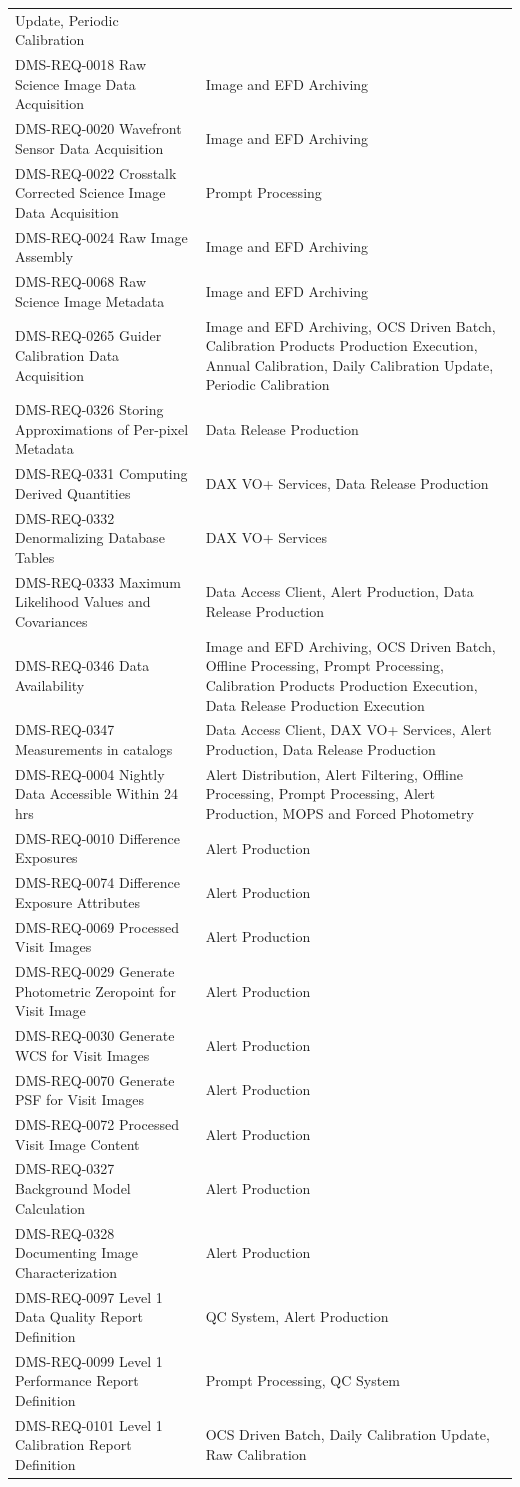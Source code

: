 \documentclass[DM,lsstdraft,toc]{lsstdoc}
\begin{document}
\begin{longtable}[]{@{}ll@{}}
Update, Periodic Calibration\tabularnewline
DMS-REQ-0018 Raw Science Image Data Acquisition & Image and EFD
Archiving\tabularnewline
DMS-REQ-0020 Wavefront Sensor Data Acquisition & Image and EFD
Archiving\tabularnewline
DMS-REQ-0022 Crosstalk Corrected Science Image Data Acquisition & Prompt
Processing\tabularnewline
DMS-REQ-0024 Raw Image Assembly & Image and EFD Archiving\tabularnewline
DMS-REQ-0068 Raw Science Image Metadata & Image and EFD
Archiving\tabularnewline
DMS-REQ-0265 Guider Calibration Data Acquisition & Image and EFD
Archiving, OCS Driven Batch, Calibration Products Production Execution,
Annual Calibration, Daily Calibration Update, Periodic
Calibration\tabularnewline
DMS-REQ-0326 Storing Approximations of Per-pixel Metadata & Data Release
Production\tabularnewline
DMS-REQ-0331 Computing Derived Quantities & DAX VO+ Services, Data
Release Production\tabularnewline
DMS-REQ-0332 Denormalizing Database Tables & DAX VO+
Services\tabularnewline
DMS-REQ-0333 Maximum Likelihood Values and Covariances & Data Access
Client, Alert Production, Data Release Production\tabularnewline
DMS-REQ-0346 Data Availability & Image and EFD Archiving, OCS Driven
Batch, Offline Processing, Prompt Processing, Calibration Products
Production Execution, Data Release Production Execution\tabularnewline
DMS-REQ-0347 Measurements in catalogs & Data Access Client, DAX VO+
Services, Alert Production, Data Release Production\tabularnewline
DMS-REQ-0004 Nightly Data Accessible Within 24 hrs & Alert Distribution,
Alert Filtering, Offline Processing, Prompt Processing, Alert
Production, MOPS and Forced Photometry\tabularnewline
DMS-REQ-0010 Difference Exposures & Alert Production\tabularnewline
DMS-REQ-0074 Difference Exposure Attributes & Alert
Production\tabularnewline
DMS-REQ-0069 Processed Visit Images & Alert Production\tabularnewline
DMS-REQ-0029 Generate Photometric Zeropoint for Visit Image & Alert
Production\tabularnewline
DMS-REQ-0030 Generate WCS for Visit Images & Alert
Production\tabularnewline
DMS-REQ-0070 Generate PSF for Visit Images & Alert
Production\tabularnewline
DMS-REQ-0072 Processed Visit Image Content & Alert
Production\tabularnewline
DMS-REQ-0327 Background Model Calculation & Alert
Production\tabularnewline
DMS-REQ-0328 Documenting Image Characterization & Alert
Production\tabularnewline
DMS-REQ-0097 Level 1 Data Quality Report Definition & QC System, Alert
Production\tabularnewline
DMS-REQ-0099 Level 1 Performance Report Definition & Prompt Processing,
QC System\tabularnewline
DMS-REQ-0101 Level 1 Calibration Report Definition & OCS Driven Batch,
Daily Calibration Update, Raw Calibration\tabularnewline

\end{longtable}
\end{document}
